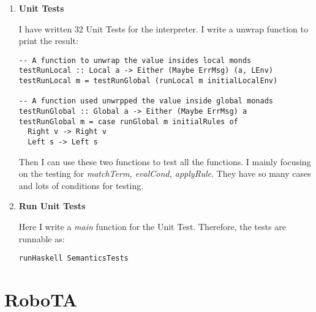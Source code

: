 \documentclass[11pt]{article}
\begin{document}
\begin{enumerate}
\item \textbf{Unit Tests}

I have written 32 Unit Tests for the interpreter. I write a unwrap function to print the result:
\begin{lstlisting}
-- A function to unwrap the value insides local monds
testRunLocal :: Local a -> Either (Maybe ErrMsg) (a, LEnv)
testRunLocal m = testRunGlobal (runLocal m initialLocalEnv)

-- A function used unwrpped the value inside global monads
testRunGlobal :: Global a -> Either (Maybe ErrMsg) a
testRunGlobal m = case runGlobal m initialRules of
  Right v -> Right v
  Left s -> Left s
\end{lstlisting}
 
Then I can use these two functions to test all the functions. I mainly focusing on the testing for \textit{matchTerm, evalCond, applyRule}.  They have so many cases and lots of conditions for testing.

\item \textbf{Run Unit Tests}

 Here I write a \textit{main} function for the Unit Test. Therefore, the tests are runnable as:
\begin{verbatim}
runHaskell SemanticsTests
\end{verbatim}
\end{enumerate}

\section{RoboTA}
\end{document}
